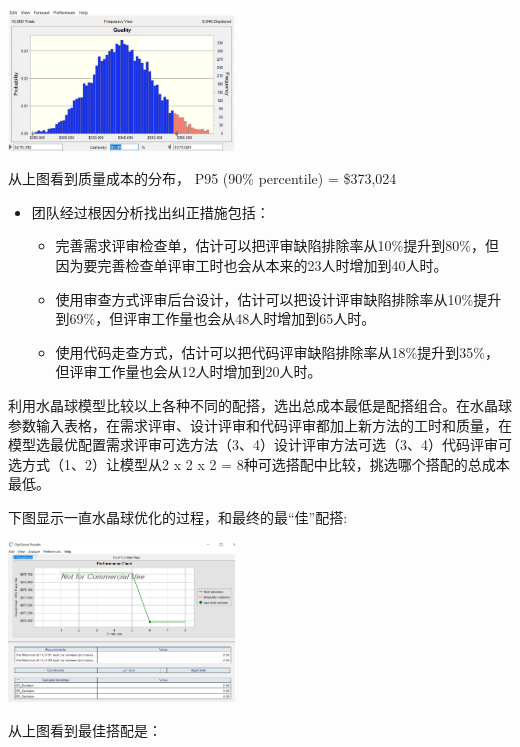 \includegraphics[width=6cm]{微信截图_20231206090641.png}

从上图看到质量成本的分布， P95 (90\% percentile) = \$373,024

\begin{itemize}
\tightlist
\item
  团队经过根因分析找出纠正措施包括：

  \begin{itemize}
  \tightlist
  \item
    完善需求评审检查单，估计可以把评审缺陷排除率从10\%提升到80\%，但因为要完善检查单评审工时也会从本来的23人时增加到40人时。
  \item
    使用审查方式评审后台设计，估计可以把设计评审缺陷排除率从10\%提升到69\%，但评审工作量也会从48人时增加到65人时。
  \item
    使用代码走查方式，估计可以把代码评审缺陷排除率从18\%提升到35\%，但评审工作量也会从12人时增加到20人时。
  \end{itemize}
\end{itemize}

利用水晶球模型比较以上各种不同的配搭，选出总成本最低是配搭组合。在水晶球参数输入表格，在需求评审、设计评审和代码评审都加上新方法的工时和质量，在模型选最优配置需求评审可选方法（3、4）设计评审方法可选（3、4）代码评审可选方式（1、2）让模型从2
x 2 x 2 = 8种可选搭配中比较，挑选哪个搭配的总成本最低。

下图显示一直水晶球优化的过程，和最终的最``佳''配搭:


\includegraphics[width=6cm]{YH.PNG}

从上图看到最佳搭配是：

